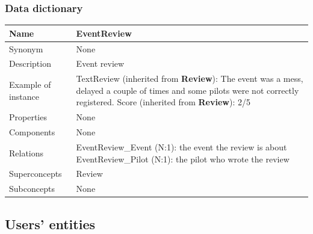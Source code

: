 \documentclass{beamer}
\begin{document}
\begin{frame}
    \frametitle{Data dictionary}
    \begin{table}
    \tiny
    \begin{tabular}{|p{2cm}|p{6cm}|}
    \hline
    Name & \textbf{EventReview} \\
    \hline
    Synonym & None \\
    \hline
    Description & Event review \\
    \hline
    Example of instance &
    TextReview (inherited from \textbf{Review}): The event was a mess, delayed a couple of times and 
    some pilots were not correctly registered. \newline
    Score (inherited from \textbf{Review}): 2/5 \\
    \hline
    Properties & None \\
    \hline
    Components & None \\
    \hline
    Relations &
    EventReview\_Event (N:1): the event the review is about \newline
    EventReview\_Pilot (N:1): the pilot who wrote the review \\
    \hline
    Superconcepts & Review \\
    \hline
    Subconcepts & None \\
    \hline
    \end{tabular}
    \end{table}
\end{frame}

\subsection*{Users' entities}
\end{document}
